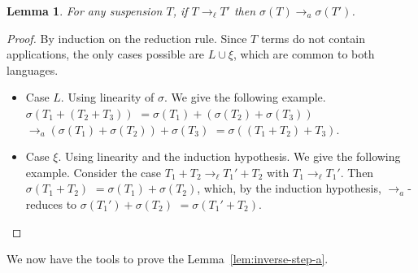 \documentclass{LMCS}
\newtheorem{lemma}[theorem]{Lemma}
\newcommand{\xto}[1]{\ensuremath{\rightarrow_{#1}}}
\newcommand{\tolinred}{\xto{\ell}}
\newcommand{\toalgred}{\xto{a}}
\begin{document}
\begin{lemma}
  \label{lem:suspension-step-a} For any suspension $T$, if $T\tolinred T'$
  then $\sigma(T)\toalgred\sigma(T')$.
\end{lemma}
\begin{proof}
  By induction on the reduction rule. Since $T$ terms do not contain
  applications, the only cases possible are $L\cup\xi$, which are common
  to both languages.
  \begin{itemize}
    \item Case $L$. Using linearity of $\sigma$. We give the following example.
      $\sigma(T_{1}+(T_{2}+T_{3}))$
      $=\sigma(T_{1})+(\sigma(T_{2})+\sigma(T_{3}))$
      $\toalgred(\sigma(T_{1})+\sigma(T_{2}))+\sigma(T_{3})$
      $=\sigma((T_{1}+T_{2})+T_{3})$.

    \item Case $\xi$. Using linearity and the induction hypothesis. We give
      the following example. Consider the case $T_{1}+T_{2}\tolinred T_{1}'+T_{2}$
      with $T_{1}\tolinred T_{1}'$. Then 
      $\sigma(T_{1}+T_{2})$
      $=\sigma(T_{1})+\sigma(T_{2})$,
      which, by the induction hypothesis, \toalgred-reduces to
      $\sigma(T_{1}')+\sigma(T_{2})$
      $=\sigma(T_{1}'+T_{2})$.
      \qedhere
  \end{itemize}
\end{proof}

We now have the tools to prove the Lemma~\ref{lem:inverse-step-a}.
\end{document}
